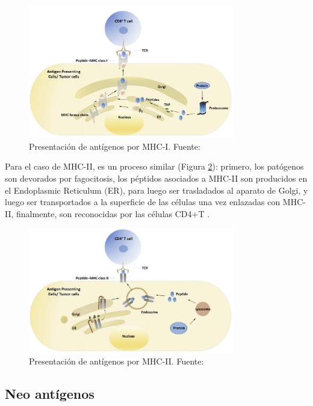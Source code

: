 \begin{figure}[H]
	\centering
	\includegraphics[width=0.8\textwidth]{../img/neoantigen/mhc1.jpg}
	\caption{Presentación de antígenos por MHC-I. Fuente: \cite{zhang2019application}}
	\label{fig:mhc1}
\end{figure}

Para el caso de MHC-II, es un proceso similar (Figura \ref{fig:mhc2}): primero, los patógenos son devorados por fagocitosis, los péptidos asociados a MHC-II son producidos en el Endoplasmic Reticulum (ER), para luego ser trasladados al aparato de Golgi, y luego ser transportados a la superficie de las células una vez enlazadas con MHC-II, finalmente, son reconocidas por las células CD4+T \citep{zhang2019application}.



\begin{figure}[H]
	\centering
	\includegraphics[width=0.8\textwidth]{../img/neoantigen/mhc2.jpg}
	\caption{Presentación de antígenos por MHC-II. Fuente: \cite{zhang2019application}}
	\label{fig:mhc2}
\end{figure}

\subsection{Neo antígenos}

